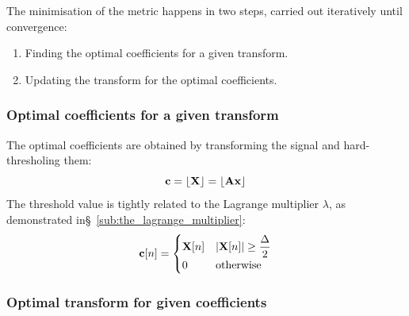\documentclass[11pt,a4paper,openright,twoside]{book}
\numberwithin{equation}{section} %
\numberwithin{figure}{section} %
\numberwithin{table}{section} %
\begin{document}
The minimisation of the metric happens in two steps, carried out iteratively
until convergence:
\begin{enumerate}
	\item Finding the optimal coefficients for a given transform.
	\item Updating the transform for the optimal coefficients.
\end{enumerate}

\subsubsection{Optimal coefficients for a given transform}
\label{ssub:optimal_coefficients_for_a_given_transform}

The optimal coefficients are obtained by transforming the signal and
hard-thresholing them:
\begin{equation}
	\mathbf{c} = \lfloor \mathbf{X} \rfloor = \lfloor \mathbf{A} \mathbf{x} \rfloor
\end{equation}
The threshold value is tightly related to the Lagrange multiplier $\lambda$,
as demonstrated in\S~\ref{sub:the_lagrange_multiplier}:
\begin{equation}
	\mathbf{c}[n] =
	\begin{cases}
		\mathbf{X}[n] & \vert \mathbf{X}[n] \vert \ge \displaystyle \frac{\Delta}{2} \\
		0     & \text{otherwise} \\
	\end{cases}
	\label{eqn:hard_threshold}
\end{equation}

\subsubsection{Optimal transform for given coefficients}
\label{ssub:optimal_transform_for_given_coefficients}
\end{document}
